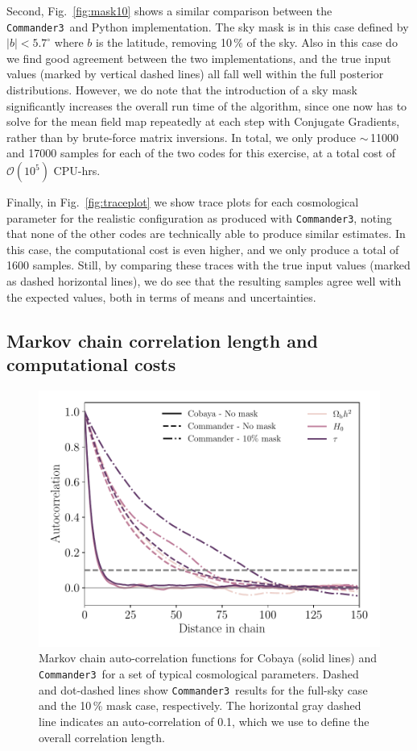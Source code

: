 \documentclass[twocolumn]{../common/aa}
\def\commanderthree{\texttt{Commander3}}
\begin{document}
Second, Fig.~\ref{fig:mask10} shows a similar comparison between the \commanderthree\ and Python implementation. The sky mask is in this case defined by $|b|<5.7^{\circ}$ where $b$ is the latitude, removing 10\,\% of the sky. Also in this case do we find good agreement between the two implementations, and the true input values (marked by vertical dashed lines) all fall well within the full posterior distributions. However, we do note that the introduction of a sky mask significantly increases the overall run time of the algorithm, since one now has to solve for the mean field map repeatedly at each step with Conjugate Gradients, rather than by brute-force matrix inversions. In total, we only produce $\sim$\,11000 and 17000 samples for each of the two codes for this exercise, at a total cost of $\mathcal{O}(10^5)$ CPU-hrs.

Finally, in Fig.~\ref{fig:traceplot} we show trace plots for each cosmological parameter for the realistic configuration as produced with \commanderthree, noting that none of the other codes are technically able to produce similar estimates. In this case, the computational cost is even higher, and we only produce a total of 1600 samples. Still, by comparing these traces with the true input values (marked as dashed horizontal lines), we do see that the resulting samples agree well with the expected values, both in terms of means and uncertainties. 

\subsection{Markov chain correlation length and computational costs}
\label{sec:resources}

\begin{figure}
	\centering
	\includegraphics[width=\linewidth]{figures/auto_correlation.pdf}
	\caption{\label{fig:autocorrelation}Markov chain auto-correlation functions for Cobaya (solid lines) and \commanderthree\ for a set of typical cosmological parameters. Dashed and dot-dashed lines show \commanderthree\ results for the full-sky case and the 10\,\% mask case, respectively. The horizontal gray dashed line indicates an auto-correlation of 0.1, which we use to define the overall correlation length.   }
\end{figure}
\end{document}
